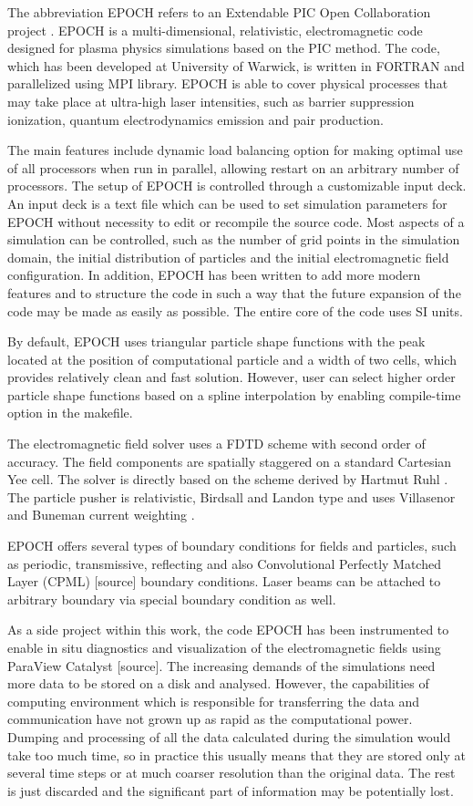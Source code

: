 The abbreviation EPOCH refers to an Extendable PIC Open Collaboration project \cite{bennett}. EPOCH is a multi-dimensional, relativistic, electromagnetic code designed for plasma physics simulations based on the PIC method. The code, which has been developed at University of Warwick, is written in FORTRAN and parallelized using MPI library. EPOCH is able to cover physical processes that may take place at ultra-high laser intensities, such as barrier suppression ionization, quantum electrodynamics emission and pair production.

The main features include dynamic load balancing option for making optimal use of all processors when run in parallel, allowing restart on an arbitrary number of processors. The setup of EPOCH is controlled through a customizable input deck. An input deck is a text file which can be used to set simulation parameters for EPOCH without necessity to edit or recompile the source code. Most aspects of a simulation can be controlled, such as the number of grid points in the simulation domain, the initial distribution of particles and the initial electromagnetic field configuration. In addition, EPOCH has been written to add more modern features and to structure the code in such a way that the future expansion of the code may be made as easily as possible. The entire core of the code uses SI units.

By default, EPOCH uses triangular particle shape functions with the peak located at the position of computational particle and a width of two cells, which provides relatively clean and fast solution. However, user can select higher order particle shape functions based on a spline interpolation by enabling compile-time option in the makefile.

The electromagnetic field solver uses a FDTD scheme with second order of accuracy. The field components are spatially staggered on a standard Cartesian Yee cell. The solver is directly based on the scheme derived by Hartmut Ruhl \cite{ruhl}. The particle pusher is relativistic, Birdsall and Landon type \cite{birdsall} and uses Villasenor and Buneman current weighting \cite{villasenor}.

EPOCH offers several types of boundary conditions for fields and particles, such as periodic, transmissive, reflecting and also Convolutional Perfectly Matched Layer (CPML) [source] boundary conditions. Laser beams can be attached to arbitrary boundary via special boundary condition as well.

As a side project within this work, the code EPOCH has been instrumented to enable in situ diagnostics and visualization of the electromagnetic fields using ParaView Catalyst [source].
The increasing demands of the simulations need more data to be stored on a disk and analysed. However, the capabilities of computing environment which is responsible for transferring the data and communication have not grown up as rapid as the computational power. Dumping and processing of all the data calculated during the simulation would take too much time, so in practice this usually means that they are stored only at several time steps or at much coarser resolution than the original data. The rest is just discarded and the significant part of information may be potentially lost.

